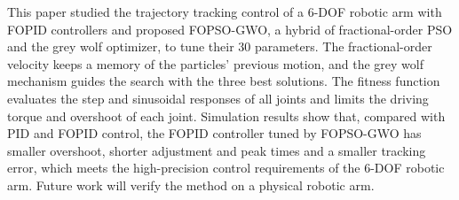 \documentclass{svproc}
\begin{document}
This paper studied the trajectory tracking control of a 6-DOF robotic arm with FOPID
controllers and proposed FOPSO-GWO, a hybrid of fractional-order PSO and the grey wolf
optimizer, to tune their 30 parameters. The fractional-order velocity keeps a memory of the
particles' previous motion, and the grey wolf mechanism guides the search with the three
best solutions. The fitness function evaluates the step and sinusoidal responses of all
joints and limits the driving torque and overshoot of each joint. Simulation results show
that, compared with PID and FOPID control, the FOPID controller tuned by FOPSO-GWO has
smaller overshoot, shorter adjustment and peak times and a smaller tracking error, which
meets the high-precision control requirements of the 6-DOF robotic arm. Future work will
verify the method on a physical robotic arm.




\end{document}
